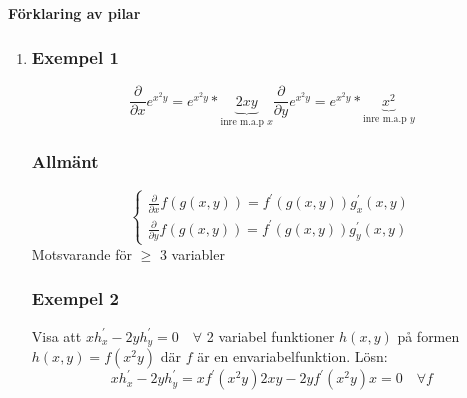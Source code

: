 \documentclass{article}
\begin{document}
\paragraph{Förklaring av pilar}
\begin{enumerate}
	\item \subsubsection*{Exempel 1}
	\[
		\frac{\partial}{\partial x} e^{x^2 y} = e^{x^2 y}*\underbrace{2xy}_{\text{inre m.a.p }x}
		\frac{\partial}{\partial y} e^{x^2 y} = e^{x^2 y}*\underbrace{x^2}_{\text{inre m.a.p }y}
	\]
	\subsubsection*{Allmänt}
	\[
		\left\{\begin{array}{rcl}
		\frac{\partial}{\partial x} f(g(x,y)) = f^{\prime}(g(x,y))g_{x}^{\prime}(x,y) \\
		\frac{\partial}{\partial y} f(g(x,y)) = f^{\prime}(g(x,y))g_{y}^{\prime}(x,y)
		\end{array}\right.
	\]
	Motsvarande för \(\geq\) 3 variabler
	\subsubsection*{Exempel 2}
	Visa att \(xh_{x}^{\prime} - 2yh_{y}^{\prime} = 0 \quad \forall\) 2 variabel funktioner \(h(x,y)\) 
	på formen \(h(x,y) = f(x^2y)\) där \(f\) är en envariabelfunktion. Lösn:
	\[
		xh_{x}^{\prime} - 2yh_{y}^{\prime} = xf^{\prime}(x^2y)2xy - 2yf^{\prime}(x^2y)x = 0 \quad \forall f
	\]
	

\end{enumerate}
\end{document}
